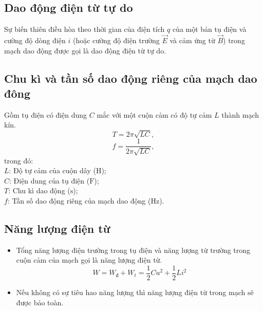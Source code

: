 \subsection {Dao động điện từ tự do}
Sự biến thiên điều hòa theo thời gian của điện tích $q$ của một bản tụ điện và cường độ dòng điện $i$ (hoặc cường độ điện trường $\vec{E}$ và cảm ứng từ $\vec{B}$) trong mạch dao động được gọi là dao động điện từ tự do.
\subsection {Chu kì và tần số dao động riêng của mạch dao đông}
Gồm tụ điện có điện dung $C$ mắc với một cuộn cảm có độ tự cảm $L$ thành mạch kín.
\begin{equation}
	T=2\pi \sqrt {LC},
\end{equation}
\begin{equation}
	f=\frac{1}{2\pi\sqrt {LC}},
\end{equation}
trong đó:\\
$L$: Độ tự cảm của cuộn dây ($\text{H}$);\\
$C$: Điện dung của tụ điện ($\text{F}$);\\
$T$: Chu kì dao động ($\text{s}$);\\
$f$: Tần số dao động riêng của mạch dao động ($\text{Hz}$).
\subsection {Năng lượng điện từ}
\begin{itemize}
	\item Tổng năng lượng điện trường trong tụ điện và năng lượng từ trường trong cuộn cảm của mạch gọi là năng lượng điện từ.\\
	\begin{equation}
		W=W_{\text{đ}}+W_{t}=\frac{1}{2}Cu^2+\frac{1}{2}Li^2
	\end{equation}
	\item Nếu không có sự tiêu hao năng lượng thì năng lượng điện từ trong mạch sẽ được bảo toàn.
\end{itemize}
